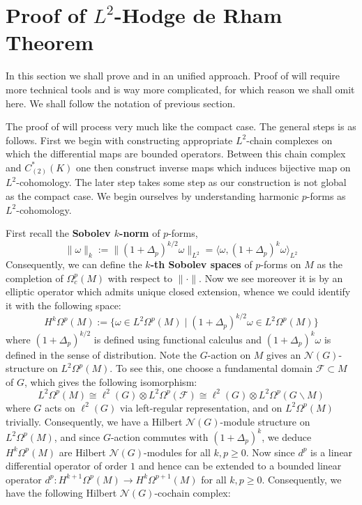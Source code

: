 \documentclass[11pt]{report}
\theoremstyle{definition}
\theoremstyle{plain}
\newcommand{\vna}{\mathcal{N}}
\newcommand{\brac}[1]{\langle #1 \rangle}
\newcommand{\norm}[1]{\lVert #1 \rVert}
\begin{document}
\section{Proof of $L^2$-Hodge de Rham Theorem}\label{proof of l2hdr}
In this section we shall prove  and  in an unified approach. Proof of  will require more technical tools and is way more complicated, for which reason we shall omit here. We shall follow the notation of previous section.
\par The proof of  will process very much like the compact case. The general steps is as follows. First we begin with constructing appropriate $L^2$-chain complexes on which the differential maps are bounded operators. Between this chain complex and $C_{(2)}^*(K)$ one then construct inverse maps which induces bijective map on $L^2$-cohomology. The later step takes some step as our construction is not global as the compact case. We begin ourselves by understanding harmonic $p$-forms as $L^2$-cohomology.
\par First recall the \textbf{Sobolev $k$-norm} of $p$-forms,  
\begin{equation}
\norm{\omega}_k:=\norm{(1+\Delta_p)^{k/2}\omega}_{L^2}=\brac{\omega, (1+\Delta_p)^k\omega}_{L^2}
\end{equation}
Consequently, we can define the \textbf{$k$-th Sobolev spaces} of $p$-forms on $M$ as the completion of $\Omega^p_c(M)$ with respect to $\norm{\cdot}$. Now we see moreover it is by  an elliptic operator which admits unique closed extension, whence we could identify it with the following space:
\begin{equation*}
H^{k}\Omega^p(M):=\{\omega\in L^2\Omega^p(M)\mid (1+\Delta_p)^{k/2}\omega \in L^2\Omega^p(M)\}
\end{equation*}
where $(1+\Delta_p)^{k/2}$ is defined using functional calculus and $(1+\Delta_p)^k\omega$ is defined in the sense of distribution. Note the $G$-action on $M$ gives an $\vna(G)$-structure on $L^2\Omega^p(M)$. To see this, one choose a fundamental domain $\mathcal{F}\subset M$ of $G$, which gives the following isomorphism:
\begin{equation}
L^2\Omega^p(M)\cong \ell^2(G)\otimes L^2\Omega^p(\mathcal{F})\cong \ell^2(G)\otimes L^2\Omega^p(G\backslash M)
\end{equation}
where $G$ acts on $\ell^2(G)$ via left-regular representation, and on $L^2\Omega^p(M)$ trivially. Consequently, we have a Hilbert $\vna(G)$-module structure on $L^2\Omega^p(M)$, and since $G$-action commutes with $(1+\Delta_p)^k$, we deduce $H^k\Omega^p(M)$ are Hilbert $\vna(G)$-modules for all $k,p\geq0$. Now since $d^p$ is a linear differential operator of order $1$ and hence can be extended to a bounded linear operator $d^p:H^{k+1}\Omega^p(M)\to H^k\Omega^{p+1}(M)$ for all $k,p\geq 0$. Consequently, we have the following Hilbert $\vna(G)$-cochain complex:
\end{document}
